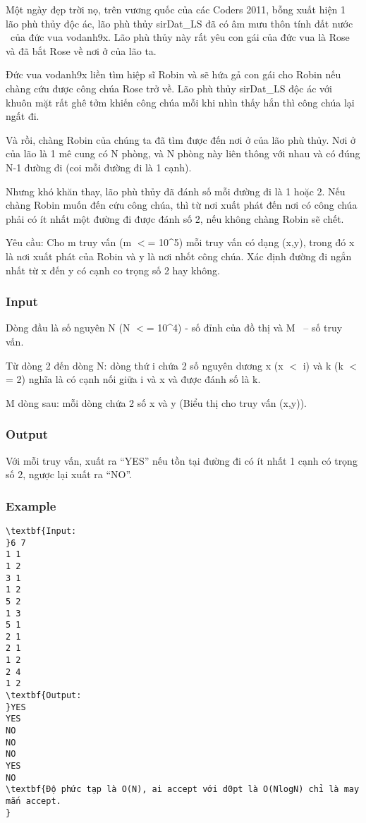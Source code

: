 

Một ngày đẹp trời nọ, trên vương quốc của các Coders 2011, bỗng xuất hiện 1 lão phù thủy độc ác, lão phù thủy sirDat\_LS đã có âm mưu thôn tính đất nước  của đức vua vodanh9x. Lão phù thủy này rất yêu con gái của đức vua là Rose và đã bắt Rose về nơi ở của lão ta.

Đức vua vodanh9x liền tìm hiệp sĩ Robin và sẽ hứa gả con gái cho Robin nếu chàng cứu được công chúa Rose trở về. Lão phù thủy sirDat\_LS độc ác với khuôn mặt rất ghê tởm khiến công chúa mỗi khi nhìn thấy hắn thì công chúa lại ngất đi.

Và rồi, chàng Robin của chúng ta đã tìm được đến nơi ở của lão phù thủy. Nơi ở của lão là 1 mê cung có N phòng, và N phòng này liên thông với nhau và có đúng N-1 đường đi (coi mỗi đường đi là 1 cạnh).

Nhưng khó khăn thay, lão phù thủy đã đánh số mỗi đường đi là 1 hoặc 2. Nếu chàng Robin muốn đến cứu công chúa, thì từ nơi xuất phát đến nơi có công chúa phải có ít nhất một đường đi được đánh số 2, nếu không chàng Robin sẽ chết.

Yêu cầu: Cho m truy vấn (m $<$= 10\textasciicircum5) mỗi truy vấn có dạng (x,y), trong đó x là nơi xuất phát của Robin và y là nơi nhốt công chúa. Xác định đường đi ngắn nhất từ x đến y có cạnh co trọng số 2 hay không.

\subsubsection{Input}

Dòng đầu là số nguyên N (N $<$= 10\textasciicircum4) - số đỉnh của đồ thị và M  – số truy vấn.

Từ dòng 2 đến dòng N: dòng thứ i chứa 2 số nguyên dương x (x $<$ i) và k (k $<$= 2) nghĩa là có cạnh nối giữa i và x và được đánh số là k.

M dòng sau: mỗi dòng chứa 2 số x và y (Biểu thị cho truy vấn (x,y)).

\subsubsection{Output}

Với mỗi truy vấn, xuất ra “YES” nếu tồn tại đường đi có ít nhất 1 cạnh có trọng số 2, ngược lại xuất ra “NO”.

\subsubsection{Example}
\begin{verbatim}
\textbf{Input:
}6 7
1 1
1 2
3 1
1 2
5 2
1 3
5 1
2 1
2 1
1 2
2 4
1 2
\textbf{Output: 
}YES
YES
NO
NO
NO
YES
NO
\textbf{Độ phức tạp là O(N), ai accept với d0pt là O(NlogN) chỉ là may mắn accept.
}\end{verbatim}